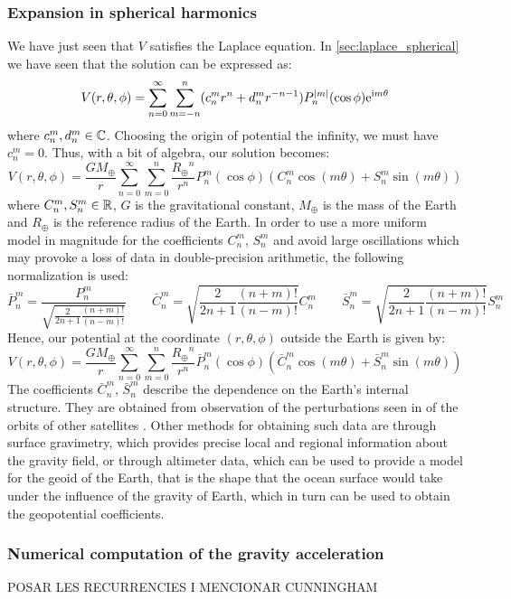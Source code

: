 \documentclass[../main.tex]{subfiles}
\begin{document}
\subsubsection{Expansion in spherical harmonics}
We have just seen that $V$ satisfies the Laplace equation. In \cref{sec:laplace_spherical} we have seen that the solution can be expressed as:
\begin{equation}
  V(r,\theta,\phi) = \sum_{n=0}^\infty \sum_{m=-n}^n (c_{n}^m r^{n} +d_n^mr^{-n-1})P_n^\abs{m}(\cos\phi) \mathrm{e}^{\mathrm{i} m\theta}
\end{equation}
where $c_{n}^m,d_n^m\in\mathbb{C}$. Choosing the origin of potential the infinity, we must have $c_{n}^m=0$. Thus, with a bit of algebra, our solution becomes:
\begin{equation}
  V(r,\theta,\phi) = \frac{GM_\oplus}{r}\sum_{n=0}^\infty \sum_{m=0}^n\frac{{R_\oplus}^n}{r^{n}}P_n^m(\cos\phi) (C_n^m\cos(m\theta)+S_n^m\sin(m\theta))
\end{equation}
where $C_n^m,S_n^m\in\mathbb{R}$, $G$ is the gravitational constant, $M_\oplus$ is the mass of the Earth and $R_\oplus$ is the reference radius of the Earth.
In order to use a more uniform model in magnitude for the coefficients $C_n^m$, $S_n^m$ and avoid large oscillations which may provoke a loss of data in double-precision arithmetic, the following normalization is used:
\begin{equation}
  \bar{P}_n^m=\frac{P_n^m}{\sqrt{\frac{2}{2n+1}\frac{(n+m)!}{(n-m)!}}}\qquad \bar{C}_n^m=\sqrt{\frac{2}{2n+1}\frac{(n+m)!}{(n-m)!}}C_n^m\qquad \bar{S}_n^m=\sqrt{\frac{2}{2n+1}\frac{(n+m)!}{(n-m)!}}S_n^m
\end{equation}
Hence, our potential at the coordinate $(r,\theta,\phi)$ outside the Earth is given by:
\begin{equation}
  V(r,\theta,\phi) = \frac{GM_\oplus}{r}\sum_{n=0}^\infty \sum_{m=0}^n\frac{{R_\oplus}^n}{r^{n}}\bar{P}_n^m(\cos\phi) (\bar{C}_n^m\cos(m\theta)+\bar{S}_n^m\sin(m\theta))
\end{equation}
The coefficients $\bar{C}_n^m$, $\bar{S}_n^m$ describe the dependence on the Earth's internal structure. They are obtained from observation of the perturbations seen in of the orbits of other satellites \cite{montenbruck}. Other methods for obtaining such data are through surface gravimetry, which provides precise local and regional information about the gravity field, or through altimeter data, which can be used to provide a model for the geoid of the Earth, that is the shape that the ocean surface would take under the influence of the gravity of Earth, which in turn can be used to obtain the geopotential coefficients.
\subsubsection{Numerical computation of the gravity acceleration}
POSAR LES RECURRENCIES I MENCIONAR CUNNINGHAM
\end{document}
